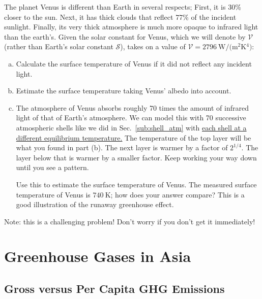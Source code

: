     \begin{exercise}
        The planet Venus is different than Earth in several respects; First, it is 30\% closer to the sun. Next, it has thick clouds that reflect 77\% of the incident sunlight. Finally, its very thick atmosphere is much more opaque to infrared light than the earth's. Given the solar constant for Venus, which we will denote by $\mathcal{V}$ (rather than Earth's solar constant $\mathcal{S}$), takes on a value of $\mathcal{V} = \SI{2796}{\watt/(\meter^2 \kelvin^4)}$:
        \begin{enumerate}[(a)]
            \item Calculate the surface temperature of Venus if it did not reflect any incident light.
            \item Estimate the surface temperature taking Venus' albedo into account.
            \item The atmosphere of Venus absorbs roughly 70 times the amount of infrared light of that of Earth's atmosphere. We can model this with 70 successive atmospheric shells like we did in Sec.~\ref{sub:shell_atm} with \underline{each shell at a different equilibrium temperature.} The temperature of the top layer will be what you found in part (b). The next layer is warmer by a factor of $2^{1/4}$. The layer below that is warmer by a smaller factor. Keep working your way down until you see a pattern.

            Use this to estimate the surface temperature of Venus. The measured surface temperature of Venus is $\SI{740}{\kelvin}$; how does your answer compare? This is a good illustration of the runaway greenhouse effect.
        \end{enumerate}
        Note: this is a challenging problem! Don't worry if you don't get it immediately! 
        \label{ex:venus}
    \end{exercise}
    



\section{Greenhouse Gases in Asia} %
\label{sec:gg_in_asia}

\subsection{Gross versus Per Capita GHG Emissions}


